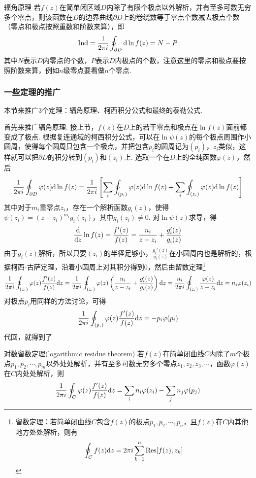 \documentclass[main.tex]{subfiles}
\begin{document}
\begin{theorem}{辐角原理}
    若\(f(z)\)在简单闭区域\(D\)内除了有限个极点以外解析，并有至多可数无穷多个零点，则该函数在\(D\)的边界曲线\(\partial D\)上的卷绕数等于零点个数减去极点个数（零点和极点按照重数和阶数来算），即
    \[{\rm Ind} = \frac{1}{2\pi i}\oint_{\partial D}{\rm d}\ln f(z) = N-P\]
    其中\(N\)表示\(D\)内零点的个数，\(P\)表示\(D\)内极点的个数，注意这里的零点和极点要按照阶数来算，例如\(n\)级零点要看做\(n\)个零点.
\end{theorem}

\subsubsection{一些定理的推广}

本节来推广3个定理：辐角原理、柯西积分公式和最终的泰勒公式.

首先来推广辐角原理. 接上节，\(f(z)\)在\(D\)上的若干零点和极点在\(\ln f(z)\)面前都变成了极点. 根据复连通域的柯西积分公式，可以在\(\ln\psi(z)\)的每个极点周围作小圆周，使得每个圆周只包含一个极点，并把包含\(p_i\)的圆周记为\((p_i)\)，\(z_i\)类似，这样就可以把\(\partial D\)的积分转到\((p_i)\)和\((z_i)\)上. 选取一个在\(D\)上的全纯函数\(\varphi(z)\)，然后
\[\frac{1}{2\pi i}\oint_{\partial D}\varphi(z){\rm d}\ln f(z) = \frac{1}{2\pi i}\left[\sum_{i}\oint_{(p_i)}\varphi(z){\rm d}\ln f(z)+\sum_{i}\oint_{(z_i)}\varphi(z){\rm d}\ln f(z)\right]\]
其中对于\(m_i\)重零点\(z_i\)，存在一个解析函数\(g_i(z)\)，使得\(\psi(z_i) = (z-z_i)^{m_i}g_i(z_i)\)，其中\(g_i(z_i)\neq 0\). 对\(\ln\psi(z)\)求导，得
\[\frac{{\rm d}}{{\rm d}z}\ln f(z) = \frac{f'(z)}{f(z)} = \frac{n_i}{z-z_i}+\frac{g_i'(z)}{g_i(z)}\]
由于\(g_i(z)\)解析，所以只要\((z_i)\)的半径足够小，\(\frac{g_i'(z)}{g_i(z)}\)在小圆周内也是解析的，根据柯西-古萨定理，沿着小圆周上对其积分得到\(0\)，然后由留数定理\footnote{留数定理：若简单闭曲线\(C\)包含\(f(z)\)的极点\(p_1, p_2, \cdots, p_n\)，且\(f(z)\)在\(C\)内其他地方处处解析，则有
\[\oint_C f(z){\rm d}z = 2\pi i\sum_{k=1}^{n}{\rm Res}[f(z),z_k]\]}
\[\frac{1}{2\pi i}\oint_{(z_i)}\varphi(z)\frac{f'(z)}{f(z)}{\rm d}z = \frac{1}{2\pi i}\oint_{(z_i)}\varphi(z)\left(\frac{n_i}{z-z_i}+\frac{g_i'(z)}{g_i(z)}\right){\rm d}z = \frac{n_i}{2\pi i}\oint_{(z_i)}\frac{\varphi(z)}{z-z_i}{\rm d}z = n_i\varphi(z_i)\]
对极点\(p_i\)用同样的方法讨论，可得
\[\frac{1}{2 \pi i}\oint_{(p_i)}\varphi(z)\frac{f'(z)}{f(z)}{\rm d}z = -p_i\varphi(p_i)\]
代回，就得到了

\begin{theorem}{对数留数定理(logarithmic residue theorem)}
    若\(f(z)\)在简单闭曲线\(C\)内除了\(m\)个极点\(p_1, p_2, \cdots, p_m\)以外处处解析，并有至多可数无穷多个零点\(z_1, z_2, z_3, \cdots\)，函数\(\varphi(z)\)在\(C\)内处处解析，则
    \[\frac{1}{2\pi i}\oint_{C}\varphi(z)\frac{f'(z)}{f(z)}{\rm d}z = \sum_{i}n_i\varphi(z_i) - \sum_{j}n_j\varphi(p_j)\]
\end{theorem}
\end{document}
